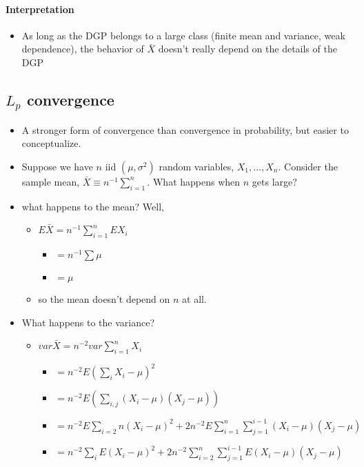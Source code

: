 \paragraph{Interpretation}
\label{sec-1-1-4}

\begin{itemize}
\item As long as the DGP belongs to a large class (finite mean and
        variance, weak dependence), the behavior of $\bar X$ doesn't
        really depend on the details of the DGP
\end{itemize}
\subsection{$L_p$ convergence}
\label{sec-1-2}

\begin{itemize}
\item A stronger form of convergence than convergence in probability,
        but easier to conceptualize.
\item Suppose we have $n$ iid $(\mu, \sigma^2)$ random variables,
        $X_1,\dots,X_n$.  Consider the sample mean, $\bar X \equiv
        n^{-1} \sum_{i=1}^n$.  What happens when $n$ gets large?
\item what happens to the mean?  Well,
\begin{itemize}
\item $E \bar X = n^{-1} \sum_{i=1}^n E X_i$
\begin{itemize}
\item $= n^{-1} \sum \mu$
\item $= \mu$
\end{itemize}
\item so the mean doesn't depend on $n$ at all.
\end{itemize}
\item What happens to the variance?
\begin{itemize}
\item $var \bar X = n^{-2} var \sum_{i=1}^n X_i$
\begin{itemize}
\item $= n^{-2} E(\sum_i X_i - \mu)^2$
\item $= n^{-2} E\left(\sum_{i,j} (X_i - \mu)(X_j - \mu)\right)$
\item $= n^{-2} E \sum_{i=2}n (X_i - \mu)^2 + 2 n^{-2} E \sum_{i = 1}^n
            \sum_{j = 1}^{i-1} (X_i - \mu) (X_j - \mu)$
\item $= n^{-2} \sum_{i} E(X_i - \mu)^2 +  2 n^{-2} \sum_{i = 2}^n
            \sum_{j = 1}^{i-1} E (X_i - \mu) (X_j - \mu)$

\end{itemize}
\end{itemize}
\end{itemize}
